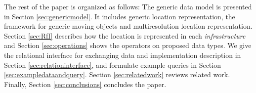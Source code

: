 The rest of the paper is organized as follows: 
The generic data model is presented in Section \ref{sec:genericmodel}. It includes generic location representation, the framework for generic moving objects and multiresolution location representation.
Section \ref{sec:RfI} describes how the location is represented in each \textit{infrastructure} and 
Section \ref{sec:operations} shows the operators on proposed data types. We give the
relational interface for exchanging data and implementation description in Section \ref{sec:relationinterface}, and formulate example queries in Section \ref{sec:exampledataandquery}. 
Section \ref{sec:relatedwork} reviews related work. Finally, Section \ref{sec:conclusions} 
concludes the paper. 

